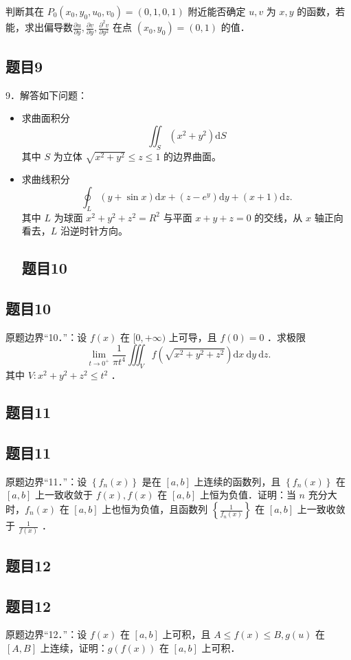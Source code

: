 \documentclass{article}
\begin{document}
判断其在 \(P_{0}\left(x_{0}, y_{0}, u_{0}, v_{0}\right)=(0,1,0,1)\) 附近能否确定 \(u, v\) 为 \(x, y\) 的函数，若能，求出偏导数\(\frac{\partial u}{\partial y}, \frac{\partial v}{\partial y}, \frac{\partial^{2} v}{\partial y^{2}}\) 在点 \(\left(x_{0}, y_{0}\right)=(0,1)\) 的值．

\subsection{题目9}
9．解答如下问题：

\begin{itemize}
  \item[（1）] 求曲面积分
\[
\iint_{S}\left(x^{2}+y^{2}\right) \mathrm{d} S
\]
其中 \(S\) 为立体 \(\sqrt{x^{2}+y^{2}} \leq z \leq 1\) 的边界曲面。
  \item[（2）] 求曲线积分
\[
\oint_{L}(y+\sin x) \mathrm{d} x+\left(z-e^{y}\right) \mathrm{d} y+(x+1) \mathrm{d} z .
\]
其中 \(L\) 为球面 \(x^{2}+y^{2}+z^{2}=R^{2}\) 与平面 \(x+y+z=0\) 的交线，从 \(x\) 轴正向看去，\(L\) 沿逆时针方向。

\subsection{题目10}
\end{itemize}

\subsection{题目10}
原题边界“10．”：设 \(f(x)\) 在 \([0,+\infty)\) 上可导，且 \(f(0)=0\) ．求极限
\[
\lim _{t \rightarrow 0^{+}} \frac{1}{\pi t^{4}} \iiint_{V} f\left(\sqrt{x^{2}+y^{2}+z^{2}}\right) \mathrm{d} x \mathrm{~d} y \mathrm{~d} z .
\]
其中 \(V: x^{2}+y^{2}+z^{2} \leq t^{2}\) ．

\subsection{题目11}

\subsection{题目11}
原题边界“11．”：设 \(\left\{f_{n}(x)\right\}\) 是在 \([a, b]\) 上连续的函数列，且 \(\left\{f_{n}(x)\right\}\) 在 \([a, b]\) 上一致收敛于 \(f(x), f(x)\) 在 \([a, b]\) 上恒为负值．证明：当 \(n\) 充分大时，\(f_{n}(x)\) 在 \([a, b]\) 上也恒为负值，且函数列 \(\left\{\frac{1}{f_{n}(x)}\right\}\) 在 \([a, b]\) 上一致收敛于 \(\frac{1}{f(x)}\) ．

\subsection{题目12}

\subsection{题目12}
原题边界“12．”：设 \(f(x)\) 在 \([a, b]\) 上可积，且 \(A \leq f(x) \leq B, g(u)\) 在 \([A, B]\) 上连续，证明：\(g(f(x))\) 在 \([a, b]\) 上可积．
\end{document}
